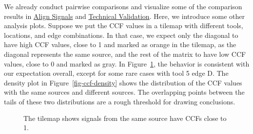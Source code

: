 \documentclass[fleqn,10pt]{wlscirep}
\begin{document}
\begin{table}
{}

\end{table}%

We already conduct pairwise comparisons and visualize some of the
comparison results in \hyperref[sec-align-signals]{Align Signals} and
\hyperref[sec-technical-validation]{Technical Validation}. Here, we
introduce some other analysis plots. Suppose we put the CCF values in a
tilemap with different tools, locations, and edge combinations. In that
case, we expect only the diagonal to have high CCF values, close to 1
and marked as orange in the tilemap, as the diagonal represents the same
source, and the rest of the matrix to have low CCF values, close to 0
and marked as gray. In Figure~\ref{fig-ccf-tilemap}, the behavior is
consistent with our expectation overall, except for some rare cases with
tool 5 edge D. The density plot in Figure~\ref{fig-ccf-density} shows
the distribution of the CCF values with the same sources and different
sources. The overlapping points between the tails of these two
distributions are a rough threshold for drawing conclusions.

\begin{figure}


\caption{\label{fig-ccf-tilemap}The tilemap shows signals from the same
source have CCFs close to 1.}

\end{figure}%
\end{document}
